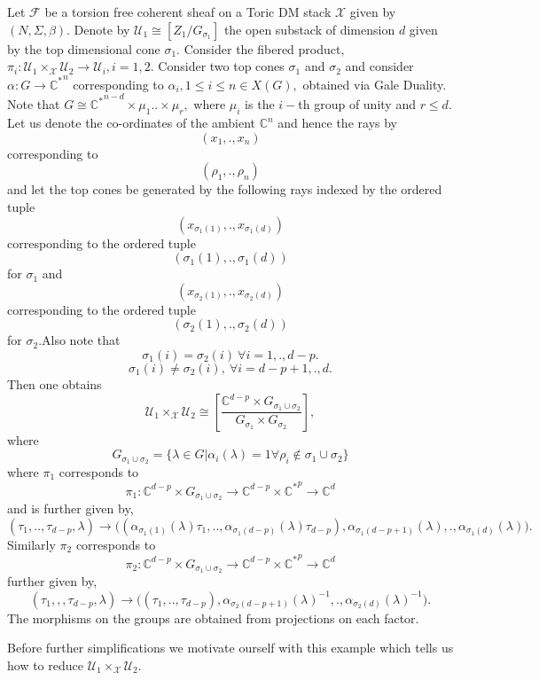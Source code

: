 \documentclass[10pt]{amsart}
\newcommand{\sX}{{\mathcal X}}
\numberwithin{equation}{subsection}
\begin{document}
Let $\mathscr{F}$ be a torsion free coherent sheaf on a Toric DM stack $\sX$ given by $(N,\Sigma,\beta).$ Denote by $\mathscr{U}_1\cong [Z_1/G_{\sigma_1}]$ the open substack of dimension $d$ given by the top dimensional cone $\sigma_1.$ Consider the fibered product, $\pi_i:\mathscr{U}_1\times_{\sX} \mathscr{U}_2\longrightarrow \mathscr{U}_i,i=1,2.$ Consider two top cones $\sigma_1$ and $\sigma_2$ and consider $\alpha: G\rightarrow \mathbb{C^*}^{n}$ corresponding to $\alpha_i ,1 \leq i\leq n \in X(G),$ obtained via Gale Duality. Note that $G\cong \mathbb{C^*}^{n-d}\times \mu_1..\times \mu_{r},$ where $\mu_i$ is the $i-$th group of unity and $r\leq d$. Let us denote the co-ordinates of the ambient $\mathbb{C}^{n}$ and hence the rays by $$(x_1,.,x_n)$$ corresponding to $$(\rho_{1},.,\rho_{n})$$ and let the top cones be generated by the following rays indexed by the ordered tuple $$(x_{\sigma_{1}(1)},.,x_{\sigma_{1}(d)})$$ corresponding to the ordered tuple $$(\sigma_{1}(1),.,\sigma_{1}(d))$$ for $\sigma_1$ and $$(x_{\sigma_{2}(1)},.,x_{\sigma_{2}(d)})$$ corresponding to the ordered tuple $$(\sigma_{2}(1),.,\sigma_{2}(d))$$ for $\sigma_2.$\newline Also note that $$\sigma_{1}(i)=\sigma_{2}(i)\ \forall i=1,.,d-p.$$
$$\sigma_{1}(i)\neq \sigma_{2}(i),\ \forall i=d-p+1,.,d.$$\newline 
Then one obtains $$\mathscr{U}_1\times_{\sX} \mathscr{U}_2 \cong 
[\frac{\mathbb{C}^{d-p}\times G_{\sigma_1\cup\sigma_2}}{G_{\sigma_1} \times G_{\sigma_2}}],
$$
where $$G_{\sigma_1\cup\sigma_2}=\{\lambda\in G|\alpha_i(\lambda)=1 \forall \rho_i \notin \sigma_1 \cup \sigma_2 \}$$ where $\pi_1$ corresponds to $$\pi_1:\mathbb{C}^{d-p}\times G_{\sigma_1\cup\sigma_2} \rightarrow \mathbb{C}^{d-p}\times \mathbb{C^*}^{p}\rightarrow \mathbb{C}^d$$ and is further given by,
$$(\tau_1,..,\tau_{d-p},\lambda)\rightarrow \big((\alpha_{\sigma_{1}(1)}(\lambda)\tau_1,..,\alpha_{\sigma_{1}(d-p)}(\lambda)\tau_{d-p}),\alpha_{\sigma_1(d-p+1)}(\lambda),.,\alpha_{\sigma_{1}(d)}(\lambda)\big).$$\newline Similarly $\pi_2$ corresponds to $$\pi_2:\mathbb{C}^{d-p}\times G_{\sigma_1\cup\sigma_2} \rightarrow \mathbb{C}^{d-p}\times \mathbb{C^*}^{p}\rightarrow\mathbb{C}^d$$ further given by,
$$(\tau_1,,,\tau_{d-p} ,\lambda)\rightarrow \big((\tau_1,..,\tau_{d-p}),\alpha_{\sigma_2(d-p+1)}(\lambda)^{-1},.,\alpha_{\sigma_{2}(d)}(\lambda)^{-1}\big).$$ The morphisms on the groups are obtained from projections on each factor.\par 
Before further simplifications we motivate ourself with this example which tells us how to reduce $\mathscr{U}_1 \times_{\sX} \mathscr{U}_2$.
\end{document}
